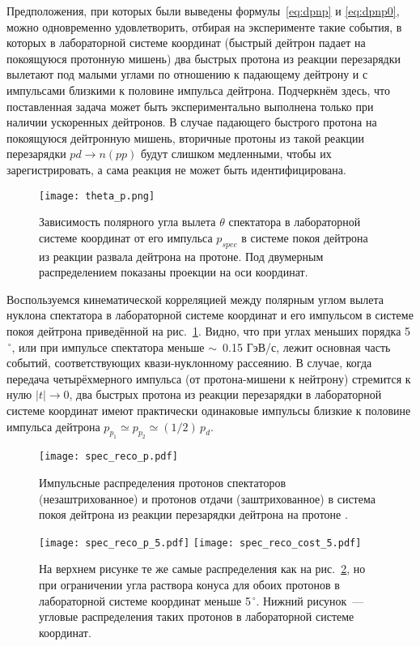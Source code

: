 Предположения, при которых были выведены формулы~\eqref{eq:dpnp} и
\eqref{eq:dpnp0}, можно одновременно удовлетворить, отбирая на эксперименте
такие события, в которых в лабораторной системе координат (быстрый дейтрон
падает на покоящуюся протонную мишень) два быстрых протона из реакции
перезарядки \dpchex вылетают под малыми углами по отношению к падающему дейтрону
и с импульсами близкими к половине импульса дейтрона. Подчеркнём здесь, что
поставленная задача может быть экспериментально выполнена только при наличии
ускоренных дейтронов. В случае падающего быстрого протона на покоящуюся
дейтронную мишень, вторичные протоны из такой реакции перезарядки
$pd \rightarrow n(pp)$ будут слишком медленными, чтобы их зарегистрировать, а
сама реакция не может быть идентифицирована.

\begin{figure}[hp]
  \centering
  \texttt{[image: theta\_p.png]}
  \caption{Зависимость полярного угла вылета $\theta$ спектатора в лабораторной
    системе координат от его импульса $p_{spec}$ в системе покоя дейтрона из
    реакции развала дейтрона на протоне. Под двумерным распределением показаны
    проекции на оси координат.}
  \label{fig:theta_p}
\end{figure}

Воспользуемся кинематической корреляцией между полярным углом вылета нуклона
спектатора в лабораторной системе координат и его импульсом в системе покоя
дейтрона приведённой на рис.~\ref{fig:theta_p}. Видно, что при углах меньших
порядка 5$^{\,\circ}$, или при импульсе спектатора меньше $\sim$~0.15 ГэВ/с,
лежит основная часть событий, соответствующих квази-нуклонному рассеянию. В
случае, когда передача четырёхмерного импульса (от протона-мишени к нейтрону)
стремится к нулю $|t| \rightarrow 0$, два быстрых протона из реакции перезарядки
в лабораторной системе координат имеют практически одинаковые импульсы близкие к
половине импульса дейтрона $p_{p_1} \simeq p_{p_2} \simeq (1/2)\,p_d$.

\begin{figure}[h]
  \centering
  \texttt{[image: spec\_reco\_p.pdf]}
  \caption{Импульсные распределения протонов спектаторов (незаштрихованное) и
    протонов отдачи (заштрихованное) в система покоя дейтрона из реакции
    перезарядки дейтрона на протоне \dpchex.}
  \label{fig:spec_reco_p}
\end{figure}

\begin{figure}[hp]
  \centering
  \vspace{-0.2cm}
  \texttt{[image: spec\_reco\_p\_5.pdf]}
  \texttt{[image: spec\_reco\_cost\_5.pdf]}
  \caption{На верхнем рисунке те же самые распределения как на
    рис.~\ref{fig:spec_reco_p}, но при ограничении угла раствора конуса
    для обоих протонов в лабораторной системе координат меньше 5$^{\,\circ}$.
    Нижний рисунок~--- угловые распределения таких протонов в лабораторной
    системе координат.}
  \label{fig:spec_reco_5}
\end{figure}

